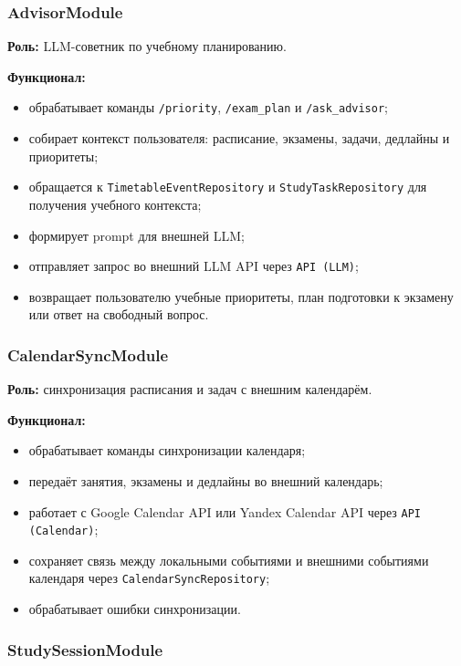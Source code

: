 \documentclass[10pt,a4paper,final]{article} %
\begin{document}
\subsubsection{AdvisorModule}

\textbf{Роль:} LLM-советник по учебному планированию.

\textbf{Функционал:}
\begin{itemize}
    \item обрабатывает команды \texttt{/priority}, \texttt{/exam\_plan} и
    \texttt{/ask\_advisor};
    \item собирает контекст пользователя: расписание, экзамены, задачи,
    дедлайны и приоритеты;
    \item обращается к \texttt{TimetableEventRepository} и
    \texttt{StudyTaskRepository} для получения учебного контекста;
    \item формирует prompt для внешней LLM;
    \item отправляет запрос во внешний LLM API через \texttt{API (LLM)};
    \item возвращает пользователю учебные приоритеты, план подготовки к
    экзамену или ответ на свободный вопрос.
\end{itemize}

\subsubsection{CalendarSyncModule}

\textbf{Роль:} синхронизация расписания и задач с внешним календарём.

\textbf{Функционал:}
\begin{itemize}
    \item обрабатывает команды синхронизации календаря;
    \item передаёт занятия, экзамены и дедлайны во внешний календарь;
    \item работает с Google Calendar API или Yandex Calendar API через
    \texttt{API (Calendar)};
    \item сохраняет связь между локальными событиями и внешними событиями
    календаря через \texttt{CalendarSyncRepository};
    \item обрабатывает ошибки синхронизации.
\end{itemize}

\subsubsection{StudySessionModule}
\end{document}
